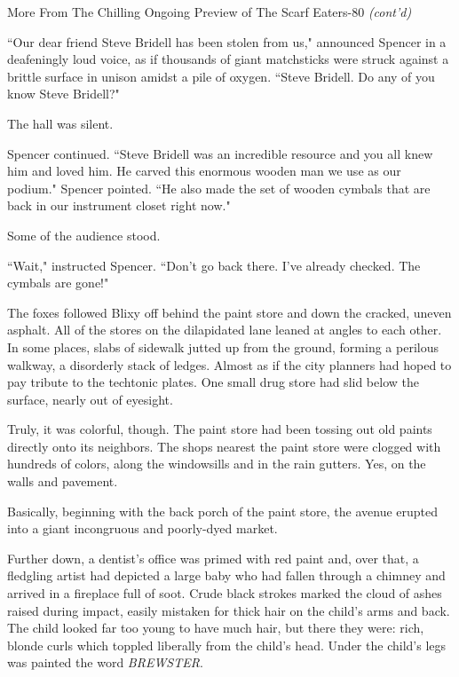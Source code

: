 \documentclass[12pt,twoside]{report}
\begin{document}
	\begin{sidebar}{More From The Chilling Ongoing Preview of The Scarf Eaters}{-80}
		\textit{(cont'd)}\vspace{6pt}

		``Our dear friend Steve Bridell has been stolen from us," announced Spencer in a deafeningly loud voice, as if thousands of giant matchsticks were struck against a brittle surface in unison amidst a pile of oxygen. ``Steve Bridell. Do any of you know Steve Bridell?"\vspace{6pt}
		
		The hall was silent.\vspace{6pt}

		Spencer continued. ``Steve Bridell was an incredible resource and you all knew him and loved him. He carved this enormous wooden man we use as our podium." Spencer pointed. ``He also made the set of wooden cymbals that are back in our instrument closet right now."\vspace{6pt}

		Some of the audience stood.\vspace{6pt}

		``Wait," instructed Spencer. ``Don't go back there. I've already checked. The cymbals are gone!"\vspace{6pt}
	\end{sidebar}

The foxes followed Blixy off behind the paint store and down the
cracked, uneven asphalt. All of the stores on the dilapidated lane
leaned at angles to each other.  In some places, slabs of sidewalk
jutted up from the ground, forming a perilous walkway, a disorderly
stack of ledges.  Almost as if the city planners had hoped to pay
tribute to the techtonic plates.  One small drug store had slid below
the surface, nearly out of eyesight.

Truly, it was colorful, though.  The paint store had been tossing out
old paints directly onto its neighbors.  The shops nearest the paint
store were clogged with hundreds of colors, along the windowsills and
in the rain gutters.  Yes, on the walls and pavement.

Basically, beginning with the back porch of the paint store, the
avenue erupted into a giant incongruous and poorly-dyed market.

Further down, a dentist's office was primed with red paint and, over
that, a fledgling artist had depicted a large baby who had fallen
through a chimney and arrived in a fireplace full of soot. Crude black
strokes marked the cloud of ashes raised during impact, easily
mistaken for thick hair on the child's arms and back.  The child
looked far too young to have much hair, but there they were: rich,
blonde curls which toppled liberally from the child's head.  Under the
child's legs was painted the word {\em BREWSTER}.
\end{document}
